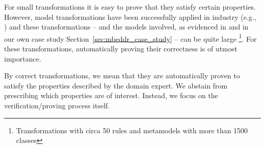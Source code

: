 For small transformations it is easy to prove that they satisfy certain
properties. However, model transformations have been successfully applied in
industry (e.g., \cite{daghsen:hal-00660252,Giese2010}) and these transformations
-- and the models involved, as evidenced in \cite{Selim2012} and in our own case
study Section~\ref{sec:mbeddr_case_study} -- can be quite large
\footnote{Transformations with circa 50 rules and metamodels with more than 1500
classes}.
For these transformations, automatically proving their correctness is of
utmost importance.

By correct transformations, we mean that they are automatically proven to satisfy the properties described by the domain expert. We abstain from prescribing which properties are of interest. Instead, we focus on the verification/proving process itself.


